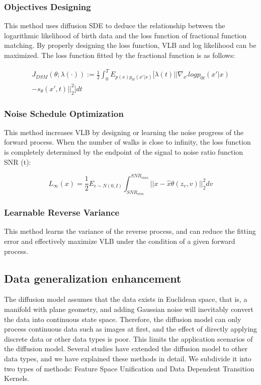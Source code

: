 \documentclass[conference]{IEEEtran}
\begin{document}
\subsubsection{Objectives Designing}\quad

This method uses diffusion SDE to deduce the relationship between the logarithmic likelihood of birth data and the loss function of fractional function matching. By properly designing the loss function, VLB and log likelihood can be maximized. The loss function fitted by the fractional function is as follows:

\begin{equation}
\begin{aligned}
    J_{DSM}(\theta;\lambda(\cdot)):=\frac{1}{2}\int_0^TE_{p(x)p_{0t}(x'|x)}[\lambda(t)||\nabla_{x'}logp_{0t}(x'|x)\\
    -s_\theta(x',t)||_2^2]dt
\end{aligned}
\end{equation}

\subsubsection{Noise Schedule Optimization}\quad

This method increases VLB by designing or learning the noise progress of the forward process. When the number of walks is close to infinity, the loss function is completely determined by the endpoint of the signal to noise ratio function SNR (t):

\begin{equation}
    L_\infty(x)=\frac{1}{2}E_{\epsilon\sim N(0,I)}\int_{SNR_{min}}^{SNR_{max}}||x-\hat{x}\theta(z_v,v)||_2^2dv
\end{equation}

\subsubsection{Learnable Reverse Variance}\quad

This method learns the variance of the reverse process, and can reduce the fitting error and effectively maximize VLB under the condition of a given forward process.

\subsection{Data generalization enhancement}

The diffusion model assumes that the data exists in Euclidean space, that is, a manifold with plane geometry, and adding Gaussian noise will inevitably convert the data into continuous state space. Therefore, the diffusion model can only process continuous data such as images at first, and the effect of directly applying discrete data or other data types is poor. This limits the application scenarios of the diffusion model. Several studies have extended the diffusion model to other data types, and we have explained these methods in detail. We subdivide it into two types of methods: Feature Space Unification and Data Dependent Transition Kernels.
\end{document}
